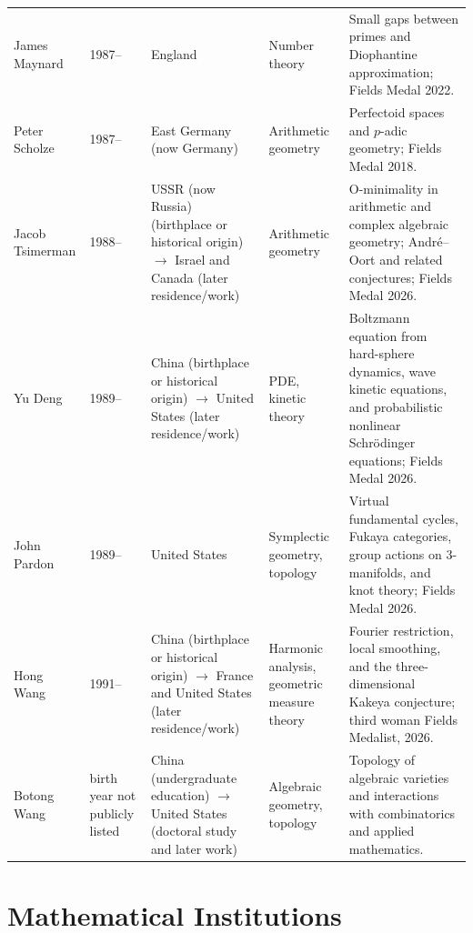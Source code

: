 {\begin{longtable}{@{}L{0.145\textwidth}L{0.09\textwidth}L{0.225\textwidth}L{0.14\textwidth}L{0.30\textwidth}@{}}
        James Maynard
        & 1987--
        & England
        & Number theory
        & Small gaps between primes and Diophantine approximation; Fields Medal
          2022. \\

        Peter Scholze
        & 1987--
        & East Germany (now Germany)
        & Arithmetic geometry
        & Perfectoid spaces and $p$-adic geometry; Fields Medal 2018. \\

        Jacob Tsimerman
        & 1988--
        & USSR (now Russia) (birthplace or historical origin) \(\to\) Israel and Canada (later residence/work)
        & Arithmetic geometry
        & O-minimality in arithmetic and complex algebraic geometry;
          André--Oort and related conjectures; Fields Medal 2026. \\

        Yu Deng
        & 1989--
        & China (birthplace or historical origin) \(\to\) United States (later residence/work)
        & PDE, kinetic theory
        & Boltzmann equation from hard-sphere dynamics, wave kinetic equations,
          and probabilistic nonlinear Schrödinger equations; Fields Medal
          2026. \\

        John Pardon
        & 1989--
        & United States
        & Symplectic geometry, topology
        & Virtual fundamental cycles, Fukaya categories, group actions on
          $3$-manifolds, and knot theory; Fields Medal 2026. \\

        Hong Wang
        & 1991--
        & China (birthplace or historical origin) \(\to\) France and United States (later residence/work)
        & Harmonic analysis, geometric measure theory
        & Fourier restriction, local smoothing, and the three-dimensional
          Kakeya conjecture; third woman Fields Medalist, 2026. \\

        Botong Wang
        & birth year not publicly listed
        & China (undergraduate education) \(\to\) United States (doctoral study and later work)
        & Algebraic geometry, topology
        & Topology of algebraic varieties and interactions with combinatorics
          and applied mathematics. \\
    \end{longtable}
    }

    \section*{Mathematical Institutions}


